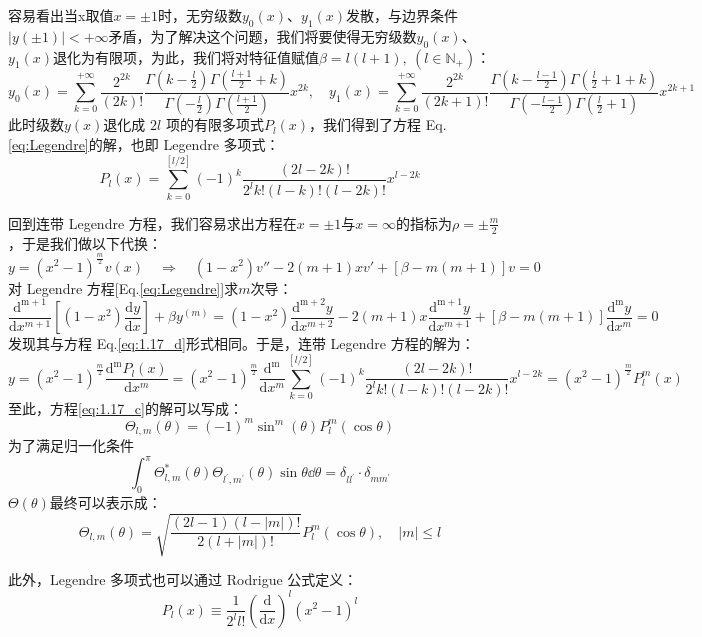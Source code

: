 容易看出当x取值$x= \pm 1$时，无穷级数$y_0(x)$、$y_1(x)$发散，与边界条件$|y(\pm 1)|< +\infty$矛盾，为了解决这个问题，我们将要使得无穷级数$y_0(x)$、$y_1(x)$退化为有限项，为此，我们将对特征值赋值$\beta=l(l+1), \ (l \in \mathbb{N}_{+})$：
\[y_0(x)=\sum_{k=0}^{+\infty}\frac{2^{2k}}{(2k)!}\frac{\Gamma(k-\frac{l}{2})\Gamma(\frac{l+1}{2}+k)}{\Gamma(-\frac{l}{2})\Gamma(\frac{l+1}{2})}x^{2k}, \quad y_1(x)=\sum_{k=0}^{+\infty}\frac{2^{2k}}{(2k+1)!}\frac{\Gamma(k-\frac{l-1}{2})\Gamma(\frac{l}{2}+1+k)}{\Gamma(-\frac{l-1}{2})\Gamma(\frac{l}{2}+1)}x^{2k+1}\]
此时级数$y(x)$退化成 $2l$ 项的有限多项式$P_l(x)$，我们得到了方程 Eq.\eqref{eq:Legendre}的解，也即 Legendre 多项式：
\[P_l(x)=\sum_{k=0}^{[l/2]}(-1)^k \frac{(2l-2k)!}{2^l k! (l-k)!(l-2k)!}x^{l-2k}\]

回到连带 Legendre 方程，我们容易求出方程在$x= \pm 1$与$x=\infty$的指标为$\rho= \pm \frac{m}{2}$，于是我们做以下代换：
\begin{equation}\label{eq:1.17_d}
y=(x^2-1)^{\frac{m}{2}}v(x) \quad \Rightarrow \quad (1-x^2)v''-2(m+1)xv'+[\beta-m(m+1)]v=0
\end{equation}
对 Legendre 方程[Eq.\eqref{eq:Legendre}]求$m$次导：
\[\frac{\mathrm{d^{m+1}}}{\mathrm{d}{x^{m+1}}} \left [(1-x^2) \frac{\mathrm{d} y}{\mathrm{d}{x}} \right ]+\beta y^{(m)}=(1-x^2)\frac{\mathrm{d^{m+2}}y}{\mathrm{d}{x^{m+2}}}-2(m+1)x\frac{\mathrm{d^{m+1}}y}{\mathrm{d}{x^{m+1}}}+[\beta-m(m+1)]\frac{\mathrm{d^{m}}y}{\mathrm{d}{x^{m}}}=0\]
发现其与方程 Eq.\eqref{eq:1.17_d}形式相同。于是，连带 Legendre 方程的解为：
\[y=(x^2-1)^{\frac{m}{2}}\frac{\mathrm{d^{m}}P_l(x)}{\mathrm{d}{x^{m}}}=(x^2-1)^{\frac{m}{2}}\frac{\mathrm{d^{m}}}{\mathrm{d}{x^{m}}}\sum_{k=0}^{[l/2]}(-1)^k \frac{(2l-2k)!}{2^l k! (l-k)!(l-2k)!}x^{l-2k}=(x^2-1)^{\frac{m}{2}}P^m_l(x)\]
至此，方程\ref{eq:1.17_c}的解可以写成：
\[\Theta_{l,m}(\theta)=(-1)^m\sin^m(\theta)P^m_l(\cos\theta)\]
为了满足归一化条件
\[\int_0^{\pi}\Theta_{l,m}^{*}(\theta)\Theta_{l^{'},m^{'}}(\theta)\sin\theta \dd\theta=\delta_{ll^{'}} \cdot \delta_{mm^{'}}\]
$\Theta(\theta)$最终可以表示成：
\[\Theta_{l,m}(\theta)=\sqrt{\frac{(2l-1)(l-|m|)!}{2(l+|m|)!}}P^{m}_l(\cos\theta), \quad |m| \leqslant l\]

此外，Legendre 多项式也可以通过 Rodrigue 公式定义：
\[P_l(x) \equiv \frac{1}{2^ll!} \left ( \frac{\mathrm{d}}{\mathrm{d}x} \right )^l(x^2-1)^l\]

